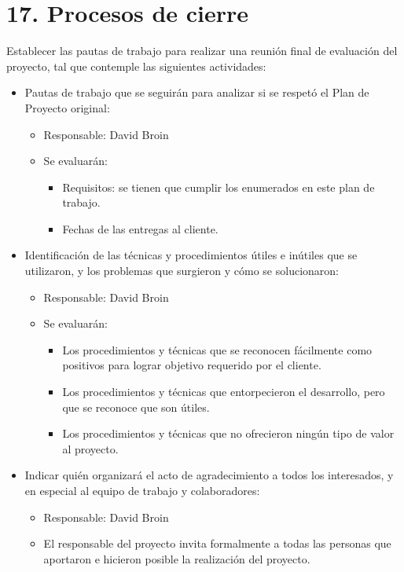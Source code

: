 \documentclass[11pt]{charter}
\begin{document}
\section{17. Procesos de cierre}    
\label{sec:cierre}

Establecer las pautas de trabajo para realizar una reunión final de evaluación del proyecto, tal que contemple las 
siguientes actividades:

\begin{itemize}
\item Pautas de trabajo que se seguirán para analizar si se respetó el Plan de Proyecto original:
\begin{itemize}
  \item Responsable: David Broin
  \item Se evaluarán:
  \begin{itemize}
    \item Requisitos: se tienen que cumplir los enumerados en este plan de trabajo.
    \item Fechas de las entregas al cliente. 
  \end{itemize}
\end{itemize}
\item Identificación de las técnicas y procedimientos útiles e inútiles que se utilizaron, y los problemas que surgieron 
y cómo se solucionaron:
\begin{itemize}
  \item Responsable: David Broin
  \item Se evaluarán:
  \begin{itemize}
    \item Los procedimientos y técnicas que se reconocen fácilmente como positivos para lograr objetivo requerido 
    por el cliente.
    \item Los procedimientos y técnicas que entorpecieron el desarrollo, pero que se reconoce que son útiles.
    \item Los procedimientos y técnicas que no ofrecieron ningún tipo de valor al proyecto.
  \end{itemize}
\end{itemize}
\item Indicar quién organizará el acto de agradecimiento a todos los interesados, y en especial al equipo de trabajo 
y colaboradores:
  \begin{itemize}
    \item Responsable: David Broin
    \item El responsable del proyecto invita formalmente a todas las personas que aportaron e hicieron posible 
    la realización del proyecto.
  \end{itemize}
\end{itemize}
\end{document}
